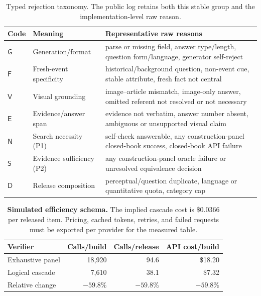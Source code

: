\documentclass{article}
\newcommand{\placeholder}[1]{\textcolor{blue!65!black}{#1}}
\begin{document}
\begin{table}[h]
\centering
\small
\setlength{\tabcolsep}{4pt}
\begin{tabular}{lp{.28\linewidth}p{.55\linewidth}}
\toprule
Code & Meaning & Representative raw reasons\\
\midrule
$\mathsf{G}$ & Generation/format & parse or missing field, answer type/length,
question form/language, generator self-reject\\
$\mathsf{F}$ & Fresh-event specificity & historical/background question,
non-event cue, stable attribute, fresh fact not central\\
$\mathsf{V}$ & Visual grounding & image--article mismatch, image-only answer,
omitted referent not resolved or not necessary\\
$\mathsf{E}$ & Evidence/answer span & evidence not verbatim, answer number absent,
ambiguous or unsupported visual claim\\
$\mathsf{N}$ & Search necessity (P1) & self-check answerable, any construction-panel
closed-book success, closed-book API failure\\
$\mathsf{S}$ & Evidence sufficiency (P2) & any construction-panel oracle failure or
unresolved equivalence decision\\
$\mathsf{D}$ & Release composition & perceptual/question duplicate, language or
quantitative quota, category cap\\
\bottomrule
\end{tabular}
\caption{Typed rejection taxonomy. The public log retains both this stable
group and the implementation-level raw reason.}
\label{tab:taxonomy}
\end{table}

\begin{table}[h]
\centering
\small
\begin{tabular}{lrrr}
\toprule
Verifier & Calls/build & Calls/release & API cost/build\\
\midrule
Exhaustive panel & \placeholder{18,920} & \placeholder{94.6} & \placeholder{\$18.20}\\
Logical cascade & \placeholder{7,610} & \placeholder{38.1} & \placeholder{\$7.32}\\
Relative change & \placeholder{$-59.8\%$} & \placeholder{$-59.8\%$} & \placeholder{$-59.8\%$}\\
\bottomrule
\end{tabular}
\caption{\textbf{Simulated efficiency schema.} The implied cascade cost is
\placeholder{\$0.0366} per released item. Pricing, cached tokens, retries, and
failed requests must be exported per provider for the measured table.}
\label{tab:cost}
\end{table}
\end{document}
